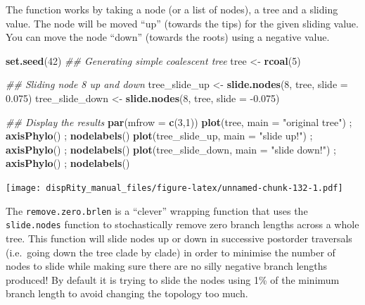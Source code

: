 \documentclass[]{book}
\newenvironment{Shaded}{\begin{snugshade}}{\end{snugshade}}
\newcommand{\CommentTok}[1]{\textcolor[rgb]{0.56,0.35,0.01}{\textit{#1}}}
\newcommand{\DataTypeTok}[1]{\textcolor[rgb]{0.13,0.29,0.53}{#1}}
\newcommand{\DecValTok}[1]{\textcolor[rgb]{0.00,0.00,0.81}{#1}}
\newcommand{\FloatTok}[1]{\textcolor[rgb]{0.00,0.00,0.81}{#1}}
\newcommand{\KeywordTok}[1]{\textcolor[rgb]{0.13,0.29,0.53}{\textbf{#1}}}
\newcommand{\NormalTok}[1]{#1}
\newcommand{\StringTok}[1]{\textcolor[rgb]{0.31,0.60,0.02}{#1}}
\begin{document}
The function works by taking a node (or a list of nodes), a tree and a sliding value.
The node will be moved ``up'' (towards the tips) for the given sliding value.
You can move the node ``down'' (towards the roots) using a negative value.

\begin{Shaded}
\begin{Highlighting}[]
\KeywordTok{set.seed}\NormalTok{(}\DecValTok{42}\NormalTok{)}
\CommentTok{## Generating simple coalescent tree}
\NormalTok{tree <-}\StringTok{ }\KeywordTok{rcoal}\NormalTok{(}\DecValTok{5}\NormalTok{)}

\CommentTok{## Sliding node 8 up and down}
\NormalTok{tree_slide_up <-}\StringTok{ }\KeywordTok{slide.nodes}\NormalTok{(}\DecValTok{8}\NormalTok{, tree, }\DataTypeTok{slide =} \FloatTok{0.075}\NormalTok{)}
\NormalTok{tree_slide_down <-}\StringTok{ }\KeywordTok{slide.nodes}\NormalTok{(}\DecValTok{8}\NormalTok{, tree, }\DataTypeTok{slide =} \FloatTok{-0.075}\NormalTok{)}

\CommentTok{## Display the results}
\KeywordTok{par}\NormalTok{(}\DataTypeTok{mfrow =} \KeywordTok{c}\NormalTok{(}\DecValTok{3}\NormalTok{,}\DecValTok{1}\NormalTok{))}
\KeywordTok{plot}\NormalTok{(tree, }\DataTypeTok{main =} \StringTok{"original tree"}\NormalTok{) ; }\KeywordTok{axisPhylo}\NormalTok{() ; }\KeywordTok{nodelabels}\NormalTok{()}
\KeywordTok{plot}\NormalTok{(tree_slide_up, }\DataTypeTok{main =} \StringTok{"slide up!"}\NormalTok{) ; }\KeywordTok{axisPhylo}\NormalTok{() ; }\KeywordTok{nodelabels}\NormalTok{()}
\KeywordTok{plot}\NormalTok{(tree_slide_down, }\DataTypeTok{main =} \StringTok{"slide down!"}\NormalTok{) ; }\KeywordTok{axisPhylo}\NormalTok{() ; }\KeywordTok{nodelabels}\NormalTok{()}
\end{Highlighting}
\end{Shaded}

\texttt{[image: dispRity\_manual\_files/figure-latex/unnamed-chunk-132-1.pdf]}

The \texttt{remove.zero.brlen} is a ``clever'' wrapping function that uses the \texttt{slide.nodes} function to stochastically remove zero branch lengths across a whole tree.
This function will slide nodes up or down in successive postorder traversals (i.e.~going down the tree clade by clade) in order to minimise the number of nodes to slide while making sure there are no silly negative branch lengths produced!
By default it is trying to slide the nodes using 1\% of the minimum branch length to avoid changing the topology too much.
\end{document}
